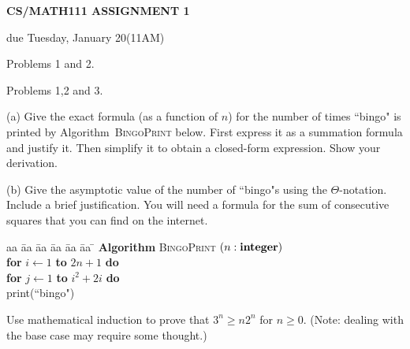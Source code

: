 \documentclass{article}
\begin{document}
\centerline{\large \bf CS/MATH111 ASSIGNMENT 1}
\centerline{due Tuesday, January 20(11AM)}

\vskip 0.1in
 Problems 1 and 2.

 Problems 1,2 and 3.

\vskip 0.2in



\begin{problem}
(a)
Give the exact formula (as a function of $n$) for the number of
times ``bingo" is printed by Algorithm~\textsc{BingoPrint} below.
First express it as a summation formula and justify it. Then simplify it to 
obtain a closed-form expression. Show your derivation.

\noindent
(b)
Give the asymptotic value of the
number of ``bingo"s using the $\Theta$-notation. Include a brief justification. You will need a formula
for the sum of consecutive squares that you can find on the internet.

\begin{tabbing}
aa \= aa \= aa \= aa \= aa \= aa \= \kill
\textbf{Algorithm} \textsc{BingoPrint} $(n: \mbox{\bf integer})$ \\
      \> \textbf{for} $i \leftarrow 1$ \textbf{to} $2n+1$
                         \textbf{do} \\
      \> \> \textbf{for} $j \leftarrow 1$ \textbf{to} $i^2+2i$ \textbf{do} \\
      \> \> \> print(``bingo")
\end{tabbing}
\end{problem}


\begin{problem}
Use mathematical induction to prove that $3^n \ge n2^n$ for $n\ge 0$. 
(Note: dealing with the base case may require some thought.)
\end{problem}
\end{document}
